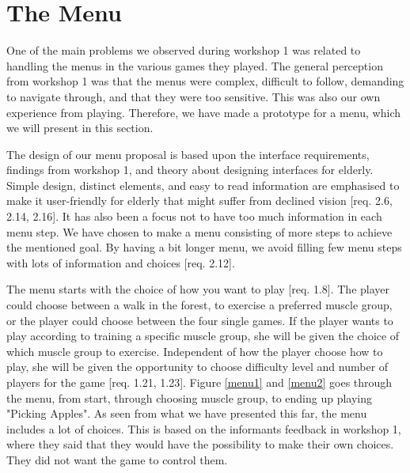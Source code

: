 \section{The Menu}
\label{sec:menu}

One of the main problems we observed during workshop 1 was related to handling the menus in the various games they played. The general perception from workshop 1 was that the menus were complex, difficult to follow, demanding to navigate through, and that they were too sensitive. This was also our own experience from playing. Therefore, we have made a prototype for a menu, which we will present in this section.

The design of our menu proposal is based upon the interface requirements, findings from workshop 1, and theory about designing interfaces for elderly. Simple design, distinct elements, and easy to read information are emphasised to make it user-friendly for elderly that might suffer from declined vision [req. 2.6, 2.14, 2.16]. It has also been a focus not to have too much information in each menu step. We have chosen to make a menu consisting of more steps to achieve the mentioned goal. By having a bit longer menu, we avoid filling few menu steps with lots of information and choices [req. 2.12].    

The menu starts with the choice of how you want to play [req. 1.8]. The player could choose between a walk in the forest, to exercise a preferred muscle group, or the player could choose between the four single games. If the player wants to play according to training a specific muscle group, she will be given the choice of which muscle group to exercise. Independent of how the player choose how to play, she will be given the opportunity to choose difficulty level and number of players for the game [req. 1.21, 1.23]. Figure \ref{menu1} and \ref{menu2} goes through the menu, from start, through choosing muscle group, to ending up playing "Picking Apples". As seen from what we have presented this far, the menu includes a lot of choices. This is based on the informants feedback in workshop 1, where they said that they would have the possibility to make their own choices. They did not want the game to control them.   


